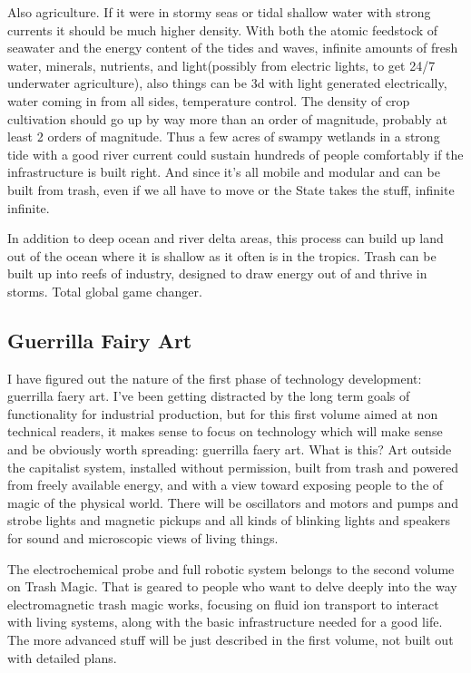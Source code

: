 Also agriculture. If it were in stormy seas or tidal shallow water with
strong currents it should be much higher density. With both the atomic
feedstock of seawater and the energy content of the tides and waves,
infinite amounts of fresh water, minerals, nutrients, and light(possibly
from electric lights, to get 24/7 underwater agriculture), also things
can be 3d with light generated electrically, water coming in from all
sides, temperature control. The density of crop cultivation should go up
by way more than an order of magnitude, probably at least 2 orders of
magnitude. Thus a few acres of swampy wetlands in a strong tide with a
good river current could sustain hundreds of people comfortably if the
infrastructure is built right. And since it's all mobile and modular and
can be built from trash, even if we all have to move or the State takes
the stuff, infinite infinite.

In addition to deep ocean and river delta areas, this process can build
up land out of the ocean where it is shallow as it often is in the
tropics. Trash can be built up into reefs of industry, designed to draw
energy out of and thrive in storms. Total global game changer.

\subsection{Guerrilla Fairy Art}\label{guerrilla-fairy-art}

I have figured out the nature of the first phase of technology
development: guerrilla faery art. I've been getting distracted by the
long term goals of functionality for industrial production, but for this
first volume aimed at non technical readers, it makes sense to focus on
technology which will make sense and be obviously worth spreading:
guerrilla faery art. What is this? Art outside the capitalist system,
installed without permission, built from trash and powered from freely
available energy, and with a view toward exposing people to the of magic
of the physical world. There will be oscillators and motors and pumps
and strobe lights and magnetic pickups and all kinds of blinking lights
and speakers for sound and microscopic views of living things.

The electrochemical probe and full robotic system belongs to the second
volume on Trash Magic. That is geared to people who want to delve deeply
into the way electromagnetic trash magic works, focusing on fluid ion
transport to interact with living systems, along with the basic
infrastructure needed for a good life. The more advanced stuff will be
just described in the first volume, not built out with detailed plans.

